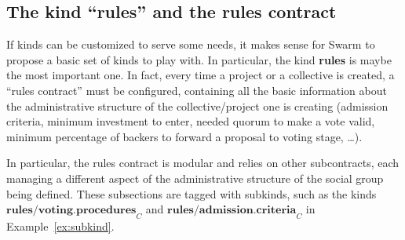 \documentclass[submission, copyright,creativecommons,sharealike,noncommercial]{eptcs}
\begin{document}
	\subsection{The kind ``\textbf{rules}'' and the rules contract}
		If kinds can be customized to serve some needs, it makes sense for Swarm to propose a basic set of kinds to play with. In particular, the kind \textbf{rules} is maybe the most important one. In fact, every time a project or a collective is created, a ``rules contract'' must be configured, containing all the basic information about the administrative structure of the collective/project one is creating (admission criteria, minimum investment to enter, needed quorum to make a vote valid, minimum percentage of backers to forward a proposal to voting stage, \dots).
		
		In particular, the rules contract is modular and relies on other subcontracts, each managing a different aspect of the administrative structure of the social group being defined. These subsections are tagged with subkinds, such as the kinds $\textbf{rules/voting.procedures}_C$ and $\textbf{rules/admission.criteria}_C$ in Example~\ref{ex:subkind}.
		
\end{document}
